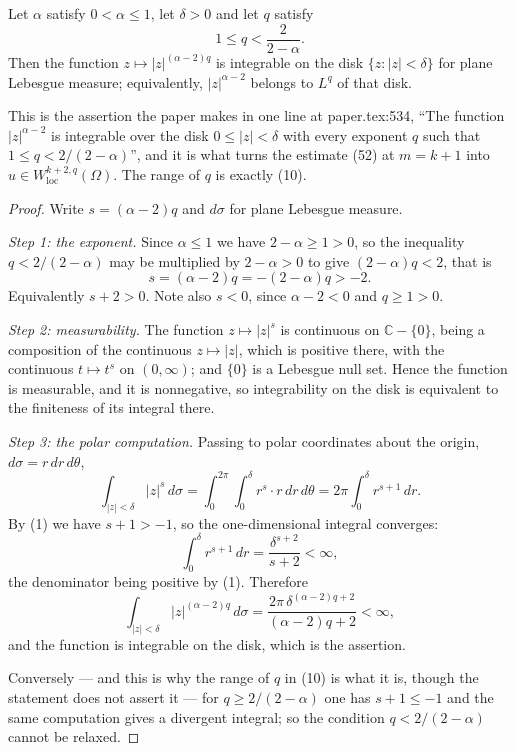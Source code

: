 \begin{lemma}
Let $\alpha$ satisfy $0<\alpha\le1$, let $\delta>0$ and let $q$ satisfy
\[
  1\le q<\frac{2}{2-\alpha}.
\]
Then the function $z\mapsto|z|^{(\alpha-2)q}$ is integrable on the disk
$\{z:|z|<\delta\}$ for plane Lebesgue measure; equivalently,
$|z|^{\alpha-2}$ belongs to $L^{q}$ of that disk.

This is the assertion the paper makes in one line at paper.tex:534, ``The
function $|z|^{\alpha-2}$ is integrable over the disk $0\le|z|<\delta$ with
every exponent $q$ such that $1\le q<2/(2-\alpha)$'', and it is what turns the
estimate (52) at $m=k+1$ into $u\in W^{k+2,q}_{\mathrm{loc}}(\Omega)$.  The
range of $q$ is exactly (10).
\end{lemma}
\begin{proof}
Write $s=(\alpha-2)q$ and $d\sigma$ for plane Lebesgue measure.

\emph{Step 1: the exponent.}  Since $\alpha\le1$ we have $2-\alpha\ge1>0$, so
the inequality $q<2/(2-\alpha)$ may be multiplied by $2-\alpha>0$ to give
$(2-\alpha)q<2$, that is
\begin{equation}\tag{1}
  s=(\alpha-2)q=-(2-\alpha)q>-2 .
\end{equation}
Equivalently $s+2>0$.  Note also $s<0$, since $\alpha-2<0$ and $q\ge1>0$.

\emph{Step 2: measurability.}  The function $z\mapsto|z|^{s}$ is continuous on
$\mathbb{C}-\{0\}$, being a composition of the continuous $z\mapsto|z|$, which
is positive there, with the continuous $t\mapsto t^{s}$ on $(0,\infty)$; and
$\{0\}$ is a Lebesgue null set.  Hence the function is measurable, and it is
nonnegative, so integrability on the disk is equivalent to the finiteness of
its integral there.

\emph{Step 3: the polar computation.}  Passing to polar coordinates about the
origin, $d\sigma=r\,dr\,d\theta$,
\[
  \int_{|z|<\delta}|z|^{s}\,d\sigma
  =\int_0^{2\pi}\!\!\int_0^{\delta}r^{s}\cdot r\,dr\,d\theta
  =2\pi\int_0^{\delta}r^{s+1}\,dr .
\]
By (1) we have $s+1>-1$, so the one-dimensional integral converges:
\[
  \int_0^{\delta}r^{s+1}\,dr=\frac{\delta^{s+2}}{s+2}<\infty ,
\]
the denominator being positive by (1).  Therefore
\[
  \int_{|z|<\delta}|z|^{(\alpha-2)q}\,d\sigma
  =\frac{2\pi\,\delta^{(\alpha-2)q+2}}{(\alpha-2)q+2}<\infty ,
\]
and the function is integrable on the disk, which is the assertion.

Conversely --- and this is why the range of $q$ in (10) is what it is, though
the statement does not assert it --- for $q\ge2/(2-\alpha)$ one has $s+1\le-1$
and the same computation gives a divergent integral; so the condition
$q<2/(2-\alpha)$ cannot be relaxed.
\end{proof}
